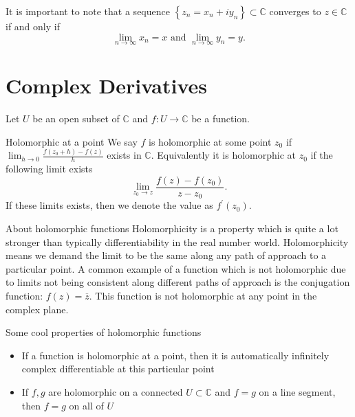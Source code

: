 \documentclass{article}
\begin{document}
        It is important to note that a sequence \( \left\{ z_n = x_{n} + iy_{n}  \right\} \subset \mathbb{C}   \)  converges to \( z \in \mathbb{C} \) if and only if 
        \[
            \lim_{n \to \infty} x_{n} = x \text{  and  } \lim_{n \to \infty} y_{n} = y.
        \]

        \section{Complex Derivatives}

        Let \( U \) be an open subset of \( \mathbb{C} \) and \( f: U \to \mathbb{C}  \) be a function. 
        
        \begin{defn}{Holomorphic at a point}{}
        We say \( f \) is holomorphic at some point \( z_0 \) if \( \lim_{h \to 0} \frac{f(z_{0} + h )- f(z)}{h}  \) exists in \( \mathbb{C} \). Equivalently it is holomorphic at \( z_0 \) if the following limit exists
        \[
            \lim_{z_0 \to z} \frac{f(z)- f(z_0)}{z - z_{0}} .
        \]
        If these limits exists, then we denote the value as \( f^\prime (z_0) \).
        \end{defn}
        
        \begin{rmk}{About holomorphic functions}{}
        Holomorphicity is a property which is quite a lot stronger than typically differentiability in the real number world. Holomorphicity means we demand the limit to be the same along any path of approach to a particular point. A common example of a function which is not holomorphic due to limits not being consistent along different paths of approach is the conjugation function: \( f(z) = \overline{z} . \) This function is not holomorphic at any point in the complex plane. 
        
        \hfill
        
        Some cool properties of holomorphic functions
        \begin{itemize}
            \item If a function is holomorphic at a point, then it is automatically infinitely complex differentiable at this particular point
            \item If \( f,g \) are holomorphic on a connected \( U \subset \mathbb{C}  \) and \( f = g \) on a line segment, then \( f = g  \) on all of \( U \) 
        \end{itemize}
        \end{rmk}
        
\end{document}
